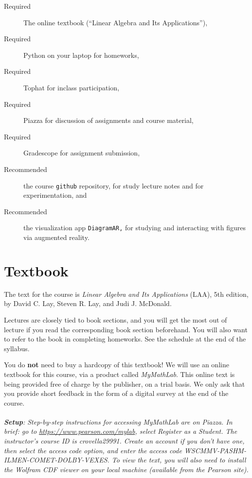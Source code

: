 \documentclass[11pt]{article}
\begin{document}
\begin{description}
\item[Required] The online textbook (``Linear Algebra and Its
  Applications''),
\item[Required] Python on your laptop for homeworks, 
\item[Required] Tophat for inclass participation,
\item[Required] Piazza for discussion of assignments and course material,
\item[Required] Gradescope for assignment submission, 
\item[Recommended] the course \texttt{github} repository, for study lecture
  notes and for experimentation, and
\item[Recommended] the visualization app \texttt{DiagramAR,} for
  studying and interacting with figures via augmented reality.
\end{description}

\section*{Textbook} 

The text for the course is \emph{Linear Algebra and
  Its Applications} (LAA), 5th edition, by David C. Lay, Steven R. Lay,
and Judi J. McDonald.    

Lectures are closely tied to book sections, and you will get
the most out of lecture if you read the corresponding book section
beforehand.   You will also want to refer to the book in completing
homeworks.   See the schedule at the end of the syllabus.

You do \textbf{not} need to buy a hardcopy of this textbook!
We will use an online textbook for this course, via a product called
\emph{MyMathLab}.   This online text is 
being provided free of charge by the publisher, on a trial basis.   We
only ask that you provide short feedback in the form of a digital
survey at the end of the course.
\\
~\\\emph{\textbf{Setup}: Step-by-step instructions for accessing MyMathLab are on
  Piazza.  In brief: go to \url{https://www.pearson.com/mylab}, select
  Register as a Student.   The instructor's course ID is crovella29991.
Create an account if you don't have one, then select the access code
option, and enter the access code WSCMMV-PASHM-ILMEN-COMET-DOLBY-VEXES.
To view the text, you will also need to install the Wolfram CDF viewer on
your local machine (available from the Pearson site).}
\end{document}
